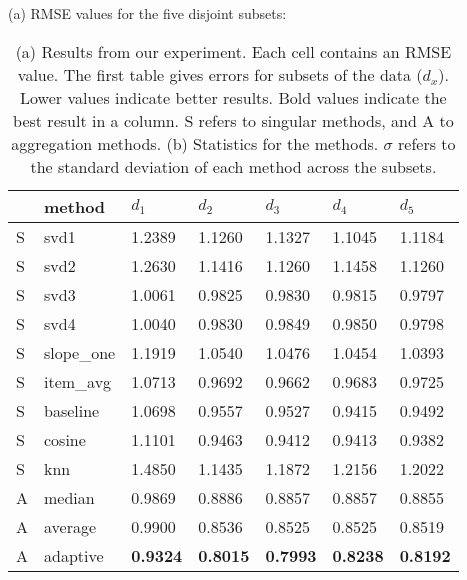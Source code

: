 \begin{table}
  
  \centering
  \caption[Results]{
    (a) Results from our experiment.
    Each cell contains an RMSE value.
    The first table gives errors for subsets of the data ($d_x$).
    Lower values indicate better results.
    Bold values indicate the best result in a column.
    S refers to singular methods, and A to aggregation methods.
    (b) Statistics for the methods. 
    $\sigma$ refers to the standard deviation of each method across the subsets.
  }
  \setlength{\extrarowheight}{0.2em}
  \vspace{0.5em}

  (a) RMSE values for the five disjoint subsets:

  \vspace{0.4em}

  \begin{tabular*}{0.47\textwidth}{ l l l l l l l }
    \hline
    { } & method & $d_1$ & $d_2$ & $d_3$ & $d_4$ & $d_5$ \\ 
    \hline
    S & svd1          & 1.2389	  & 1.1260	  & 1.1327	  & 1.1045	  & 1.1184	 \\
    S & svd2          & 1.2630	  & 1.1416    & 1.1260	  & 1.1458	  & 1.1260	 \\
    S & svd3          & 1.0061	  & 0.9825	  & 0.9830	  & 0.9815	  & 0.9797	 \\
    S & svd4          & 1.0040	  & 0.9830	  & 0.9849	  & 0.9850	  & 0.9798	 \\
    S & slope\_one    & 1.1919	  & 1.0540	  & 1.0476	  & 1.0454	  & 1.0393   \\
    S & item\_avg     & 1.0713	  & 0.9692	  & 0.9662	  & 0.9683	  & 0.9725	 \\
    S & baseline       & 1.0698	  & 0.9557	  & 0.9527	  & 0.9415	  & 0.9492	 \\
    S & cosine   	    & 1.1101	  & 0.9463	  & 0.9412	  & 0.9413	  & 0.9382	 \\
    S & knn       	  & 1.4850	  & 1.1435	  & 1.1872    & 1.2156	  & 1.2022	 \\
    \hline                                                                    
    A & median    	  & 0.9869	  & 0.8886	  & 0.8857    & 0.8857	  & 0.8855	 \\
    A & average    	  & 0.9900	  & 0.8536	  & 0.8525	  & 0.8525	  & 0.8519	 \\
    A & adaptive       & \textbf{0.9324}	  & \textbf{0.8015}	  & \textbf{0.7993}  & \textbf{0.8238} & \textbf{0.8192} \\
    \hline
  \end{tabular*}


\end{table}
